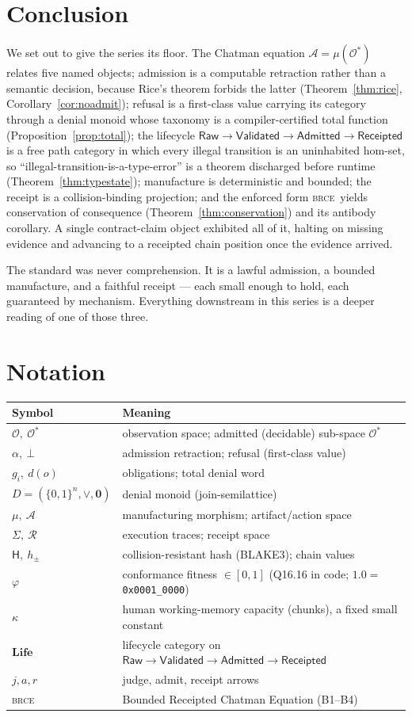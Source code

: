 \documentclass[11pt,oneside]{book}
\theoremstyle{definition}
\theoremstyle{plain}
\theoremstyle{remark}
\newcommand{\Obs}{\mathcal{O}}                 %
\newcommand{\Adm}{\mathcal{O}^{*}}             %
\newcommand{\Act}{\mathcal{A}}                 %
\newcommand{\Rec}{\mathcal{R}}                 %
\newcommand{\muop}{\mu}                        %
\newcommand{\adm}{\alpha}                      %
\newcommand{\chainH}{\mathsf{H}}               %
\newcommand{\Rfsl}{\bot}                        %
\newcommand{\CL}{\kappa}                       %
\newcommand{\Fitness}{\varphi}
\newcommand{\Raw}{\mathsf{Raw}}
\newcommand{\Val}{\mathsf{Validated}}
\newcommand{\Admd}{\mathsf{Admitted}}
\newcommand{\Rcpt}{\mathsf{Receipted}}
\newcommand{\Life}{\mathbf{Life}}
\newcommand{\BRCE}{\textsc{brce}}
\newcommand{\code}[1]{\texttt{#1}}
\begin{document}
\chapter{Conclusion}

We set out to give the series its floor. The Chatman equation $\Act=\muop(\Adm)$ relates
five named objects; admission is a computable retraction rather than a semantic decision,
because Rice's theorem forbids the latter (Theorem~\ref{thm:rice},
Corollary~\ref{cor:noadmit}); refusal is a first-class value carrying its category through a
denial monoid whose taxonomy is a compiler-certified total function
(Proposition~\ref{prop:total}); the lifecycle $\Raw\to\Val\to\Admd\to\Rcpt$ is a free path
category in which every illegal transition is an uninhabited hom-set, so
``illegal-transition-is-a-type-error'' is a theorem discharged before runtime
(Theorem~\ref{thm:typestate}); manufacture is deterministic and bounded; the receipt is a
collision-binding projection; and the enforced form \BRCE\ yields conservation of
consequence (Theorem~\ref{thm:conservation}) and its antibody corollary. A single
contract-claim object exhibited all of it, halting on missing evidence and advancing to a
receipted chain position once the evidence arrived.

The standard was never comprehension. It is a lawful admission, a bounded manufacture, and a
faithful receipt --- each small enough to hold, each guaranteed by mechanism. Everything
downstream in this series is a deeper reading of one of those three.

\appendix
\chapter{Notation}
\begin{tabular}{ll}
\toprule
Symbol & Meaning\\
\midrule
$\Obs,\ \Adm$ & observation space; admitted (decidable) sub-space $\Obs^{*}$\\
$\adm,\ \Rfsl$ & admission retraction; refusal (first-class value)\\
$g_i,\ d(o)$ & obligations; total denial word\\
$D=(\{0,1\}^n,\lor,\bm0)$ & denial monoid (join-semilattice)\\
$\muop,\ \Act$ & manufacturing morphism; artifact/action space\\
$\Sigma,\ \Rec$ & execution traces; receipt space\\
$\chainH,\ h_\pm$ & collision-resistant hash (BLAKE3); chain values\\
$\Fitness$ & conformance fitness $\in[0,1]$ (Q16.16 in code; $1.0=$\code{0x0001\_0000})\\
$\CL$ & human working-memory capacity (chunks), a fixed small constant\\
$\Life$ & lifecycle category on $\Raw\to\Val\to\Admd\to\Rcpt$\\
$j,a,r$ & judge, admit, receipt arrows\\
\BRCE & Bounded Receipted Chatman Equation (B1--B4)\\
\bottomrule
\end{tabular}
\end{document}
